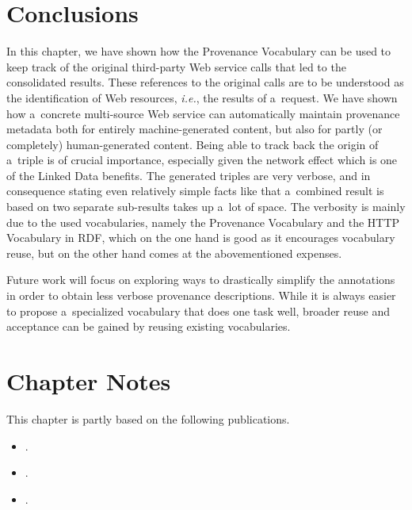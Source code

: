 \section{Conclusions}

In this chapter, we have shown how the Provenance
Vocabulary can be used to keep track of the original
third-party Web service calls that led to the consolidated
results. These references to the original calls
are to be understood as the identification of Web resources,
\emph{i.e.}, the results of a~request.
We have shown how a~concrete multi-source Web service can
automatically maintain provenance metadata
both for entirely machine-generated content,
but also for partly (or completely) human-generated content.
Being able to track back the origin of a~triple
is of crucial importance,
especially given the network effect which is one of the
Linked Data benefits.
The generated triples are very verbose,
and in consequence stating even relatively simple facts like
that a~combined result is based on two separate sub-results
takes up a~lot of space.
The verbosity is mainly due to the used vocabularies,
namely the Provenance Vocabulary and the HTTP Vocabulary in RDF,
which on the one hand is good as it encourages vocabulary reuse,
but on the other hand comes at the abovementioned expenses.

Future work will focus on exploring ways
to drastically simplify the annotations in order to obtain
less verbose provenance descriptions.
While it is always easier to propose a~specialized vocabulary
that does one task well, broader reuse and acceptance
can be gained by reusing existing vocabularies.

\section*{Chapter Notes}
This chapter is partly based on the following publications.

\begin{itemize}
  \item {}.
  \item {}.
  \item {}.
\end{itemize}

\clearpage
\printbibliography[heading=subbibliography]